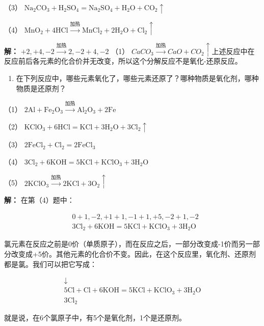 （3）
\(\mathrm{Na}_{2} \mathrm{CO}_{3} + \mathrm{H}_{2} \mathrm{SO}_{4} = \mathrm{Na}_{2} \mathrm{SO}_{4} + \mathrm{H}_{2} \mathrm{O} + \mathrm{CO}_{2} \uparrow\)

（4）
\(\mathrm{MnO_2 + 4HCl\xrightarrow{\text{加热}} MnCl_2 + 2H_2O + Cl_2\uparrow}\)

\textbf{解：} \(+2,+4,-2\xrightarrow{\text{加热}}2,-2+4,-2\) （1）
\(CaCO_{3}\xrightarrow{\text{加热}}CaO+CO_{2}\uparrow\)上述反应中在反应前后各元素的化合价并无改变，所以这个分解反应不是氧化-还原反应。

\begin{enumerate}[start=6]
\item
  在下列反应中，哪些元素氧化了，哪些元素还原了？哪种物质是氧化剂，哪种物质是还原剂？
\end{enumerate}

（1）
\(2\mathrm{Al} + \mathrm{Fe}_{2}\mathrm{O}_{3}\xrightarrow{\text{加热}}\mathrm{Al}_{2}\mathrm{O}_{3} + 2\mathrm{Fe}\)

（2） \(\mathrm{KClO_3 + 6HCl = KCl + 3H_2O + 3Cl_2\uparrow}\)

（3） \(2\mathrm{FeCl}_2 + \mathrm{Cl}_2 = 2\mathrm{FeCl}_3\)

（4）
\(3\mathrm{Cl}_2 + 6\mathrm{KOH} = 5\mathrm{KCl} + \mathrm{KClO}_3 + 3\mathrm{H}_2\mathrm{O}\)

（5）
\(2\mathrm{KClO}_{3}\xrightarrow{\text{加热}} 2\mathrm{KCl} + 3\mathrm{O}_{2}\uparrow\)

\textbf{解：} 在第（4）题中：

\[
\begin{array}{rl} & 0 + 1, - 2, + 1 + 1, - 1 + 1, + 5, - 2 + 1, - 2 \\ & 3 \mathrm{Cl} _ {2} + 6 \mathrm{KOH} = 5 \mathrm{KCl} + \mathrm{KClO} _ {3} + 3 \mathrm{H} _ {2} \mathrm{O} \end{array}
\]

氯元素在反应之前是0价（单质原子），而在反应之后，一部分改变成-1价而另一部分改变成+5价。其他元素的化合价不变。因此，在这个反应里，氧化剂、还原剂都是氯。我们可以把它写成：

\[
\begin{array}{c} \downarrow \\ 5 \mathrm{Cl} + \mathrm{Cl} + 6 \mathrm{KOH} = 5 \mathrm{KCl} + \mathrm{KClO} _ {3} + 3 \mathrm{H} _ {2} \mathrm{O} \\ \hline 3 \mathrm{Cl} _ {2} \end{array}
\]

就是说，在6个氯原子中，有5个是氧化剂，1个是还原剂。

